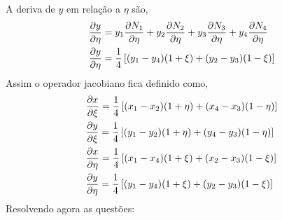 %
A deriva de $y$ em relação a  $\eta$ são,
%
\begin{equation}
	\begin{split}
		&	\frac{\partial y}{\partial \eta} = y_1 \frac{\partial N_1}{\partial \eta} + y_2 \frac{\partial N_2}{\partial \eta} + y_3 \frac{\partial N_3}{\partial \eta} + y_4 \frac{\partial N_4}{\partial \eta}\\
		&   \frac{\partial y}{\partial \eta} = \frac{1}{4}\left[ (y_1 - y_4)(1 + \xi) + (y_2 - y_3)(1 - \xi) \right]
	\end{split}
\end{equation}
%
Assim o operador jacobiano fica definido como,
%
\begin{equation}
	\begin{split}
&	\frac{\partial x}{\partial \xi } = \frac{1}{4}\left[ (x_1 - x_2)(1 + \eta) + (x_4 - x_3)(1 - \eta) \right]\\
&   \frac{\partial y}{\partial \xi } = \frac{1}{4}\left[ (y_1 - y_2)(1 + \eta) + (y_4 - y_3)(1 - \eta) \right]\\
&   \frac{\partial x}{\partial \eta} = \frac{1}{4}\left[ (x_1 - x_4)(1 + \xi ) + (x_2 - x_3)(1 - \xi ) \right]\\
&   \frac{\partial y}{\partial \eta} = \frac{1}{4}\left[ (y_1 - y_4)(1 + \xi ) + (y_2 - y_3)(1 - \xi ) \right]
	\end{split}
\end{equation}
%
Resolvendo agora as questões:
%
